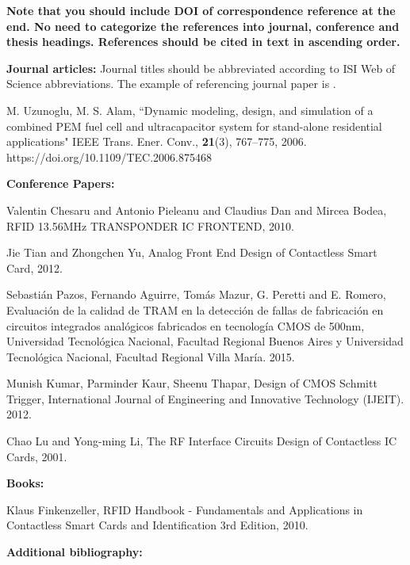 \documentclass{article} %
\begin{document}
\begin{multicols}{2}
\textbf{Note that you should include DOI of correspondence reference at the end. No need to categorize the references into journal, conference and thesis headings. References should be cited in text in ascending order.}
\newline

\footnotesize{

\noindent \textbf{Journal articles:} Journal titles should be abbreviated according to ISI Web of Science abbreviations. The example of referencing journal paper is \cite{journal1}. 
\begin{thebibliography}{99}
	M. Uzunoglu, M. S. Alam, ``Dynamic modeling, design, and simulation of a combined PEM fuel cell and ultracapacitor system for stand-alone residential applications" IEEE Trans. Ener. Conv., \textbf{21}(3), 767--775, 2006. https://doi.org/10.1109/TEC.2006.875468


\hspace{-1cm} \textbf{Conference Papers:}

	Valentin Chesaru and Antonio Pieleanu and Claudius Dan and Mircea Bodea, RFID 13.56MHz TRANSPONDER IC FRONTEND, 2010.

	Jie Tian and Zhongchen Yu, Analog Front End Design of Contactless Smart Card, 2012.

	Sebastián Pazos, Fernando Aguirre, Tomás Mazur, G. Peretti and E. Romero, Evaluación de la calidad de TRAM en la detección de fallas de fabricación en circuitos integrados analógicos fabricados en tecnología CMOS de 500nm, Universidad Tecnológica Nacional, Facultad Regional Buenos Aires y Universidad Tecnológica Nacional, Facultad Regional Villa María. 2015.

	Munish Kumar, Parminder Kaur, Sheenu Thapar, Design of CMOS Schmitt Trigger, International Journal of Engineering and Innovative Technology (IJEIT). 2012.

	Chao Lu and Yong-ming Li, The RF Interface Circuits Design of Contactless IC Cards, 2001.

\hspace{-1cm} \textbf{Books:}

	Klaus Finkenzeller, RFID Handbook - Fundamentals and Applications in Contactless Smart Cards and Identification 3rd Edition, 2010.

\hspace{-1cm} \textbf{Additional bibliography:}


\end{thebibliography}}
\end{multicols}
\end{document}
